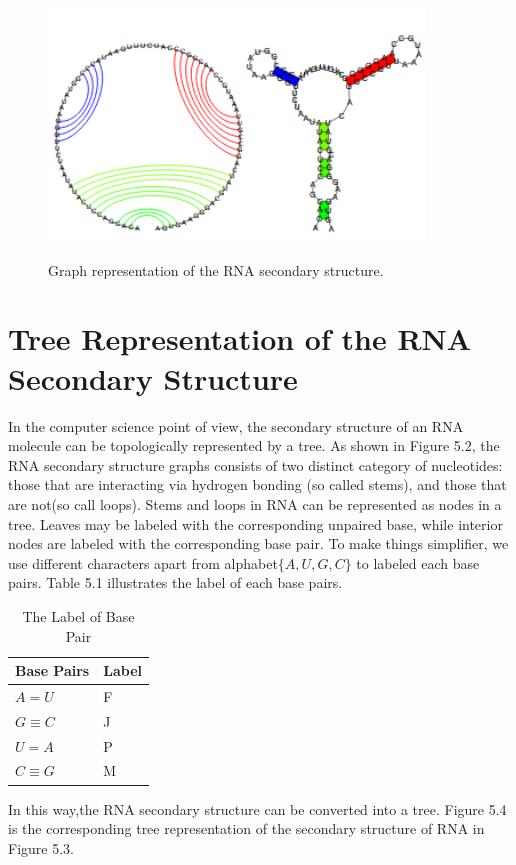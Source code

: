 \begin{figure}
		\centering
		\includegraphics[width=10cm,clip]{Figures/RNAST2}
		\label{Graph Representation of the RNA Secondary Structure.} 
		\caption{Graph representation of the RNA secondary structure.}
\end{figure}

\section{Tree Representation of the RNA Secondary Structure}
In the computer science point of view, the secondary structure of an RNA molecule can be topologically represented by a tree. As shown in Figure 5.2, the RNA secondary structure graphs consists of two distinct category of nucleotides: those that are interacting via hydrogen bonding (so called stems), and those that are not(so call loops). Stems and loops in RNA can be represented as nodes in a tree. Leaves may be labeled with the corresponding unpaired base, while interior nodes are labeled with the corresponding base pair. To make things simplifier, we use different characters apart from alphabet$\{A, U, G, C\}$ to labeled each base pairs. Table 5.1 illustrates the label of each base pairs. 
\begin{table}
			\centering
			\begin{tabular}{l l}
				\toprule
				\textbf{Base Pairs} & \textbf{Label}\\
				\midrule
				$A = U$ & F\\
				$G \equiv C$ & J\\
				$U = A$ & P\\
				$C \equiv G$ & M\\
			\end{tabular}
		\caption{The Label of Base Pair}
\end{table}
In this way,the RNA secondary structure can be converted into a tree. Figure 5.4 is the corresponding tree representation of the secondary structure of RNA in Figure 5.3.

